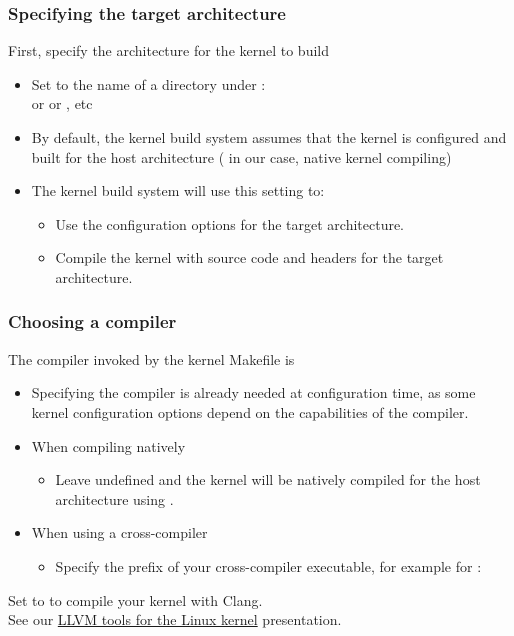 \begin{frame}
  \frametitle{Specifying the target architecture}
  First, specify the architecture for the kernel to build
  \begin{itemize}
  \item Set  to the name of a directory under :\\
	 or  or , etc
  \item By default, the kernel build system assumes that the
        kernel is configured and built for the host architecture
	( in our case, native kernel compiling)
  \item The kernel build system will use this setting to:
	\begin{itemize}
	\item Use the configuration options for the target
	      architecture.
	\item Compile the kernel with source code and headers
	      for the target architecture.
	\end{itemize}
  \end{itemize}
\end{frame}

\begin{frame}[fragile]
  \frametitle{Choosing a compiler}
  The compiler invoked by the kernel Makefile is 
  \begin{itemize}
    \item Specifying the compiler is already needed at configuration
	  time, as some kernel configuration options depend on the
          capabilities of the compiler.
    \item When compiling natively
      \begin{itemize}
	 \item Leave  undefined and the kernel
	    will be natively compiled for the host architecture
            using .
      \end{itemize}
    \item When using a cross-compiler
      \begin{itemize}
      \item Specify the prefix of your cross-compiler executable, for
            example for :\\
      \end{itemize}
  \end{itemize}
  Set  to  to compile your kernel with Clang.\\
  See our \href{https://bootlin.com/pub/conferences/2022/lee/opdenacker-llvm-tools-for-linux-kernel/opdenacker-llvm-tools-for-linux-kernel.pdf}
  {LLVM tools for the Linux kernel} presentation.
\end{frame}

